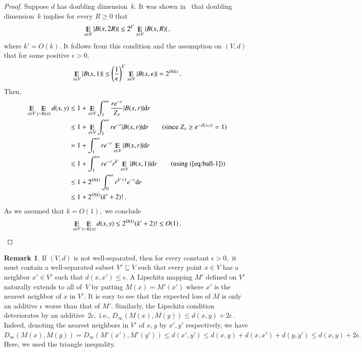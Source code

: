 \documentclass[letterpaper,11pt]{article}
\theoremstyle{definition}
\newtheorem{remark}{Remark}[section]
\renewcommand{\mathbb}{\varmathbb}
\newcommand{\Esymb}{\mathbb{E}}
\DeclareMathOperator*{\E}{\Esymb}
\newcommand{\mper}{\,.}
\newcommand{\mcom}{\,,}
\newcommand{\rd}{\mathrm{d}}
\newcommand\ExM{\mathrm{E}}
\begin{document}
\begin{proof}
Suppose $d$ has doubling dimension~$k.$
It was shown in~\cite{ChanGu08} that doubling dimension~$k$ implies for every
$R\ge0$ that
\begin{equation}\label{eq:ball-avg}
\E_{x\in V} |B(x,2R)|
\le 2^{k'}\E_{x\in V} |B(x,R)|\mcom
\end{equation}
where $k'=O(k).$
It follows from this condition and the assumption on $(V,d)$
that for some positive $\epsilon>0,$
\begin{equation}\label{eq:ball-1}
\E_{x\in V}|B(x,1)|\le
\left(\frac1\epsilon\right)^{k'}\E_{x\in V}|B(x,\epsilon)|= 2^{O(k)}\mper
\end{equation}
Then,
\begin{align*}
\E_{x\in V}\E_{y\sim \ExM(x)}  d(x,y)
& \le 1 +\E_{x\in V}\int_1^\infty \frac{re^{-r}}{Z_x}|B(x,r)|\rd r\\
& \le 1 +\E_{x\in V}\int_1^\infty re^{-r}|B(x,r)|\rd r \tag{since $Z_x\ge
e^{-d(x,x)}=1$}\\
& = 1 + \int_1^\infty re^{-r} \E_{x\in V}|B(x,r)|\rd r\\
& \le 1 + \int_1^\infty re^{-r} r^{k'}\E_{x\in V}|B(x,1)|\rd r
\tag{using~(\ref{eq:ball-1})}\\
& \le 1+ 2^{O(k)}\int_0^\infty r^{k'+1}e^{-r} \rd r\\
& \le 1+ 2^{O(k)}(k'+2)!\mper
\end{align*}
As we assumed that $k=O(1),$ we conclude
\[
\E_{x\in V}\E_{y\sim \ExM(x)} d(x,y)
\le 2^{O(k)}(k'+2)! \le O(1)\mper
\]
\end{proof}
%
\begin{remark}\label{rem:not-separated}
If $(V,d)$ is not well-separated, then for every constant $\epsilon>0,$ it
must contain a well-separated subset
$V'\subseteq V$ such that every point $x\in V$ has a neighbor $x'\in V'$ such
that $d(x,x')\le\epsilon.$ A Lipschitz mapping $M'$ defined on $V'$ naturally
extends to all of~$V$ by putting $M(x)=M'(x')$
where $x'$ is the nearest neighbor of $x$ in $V'.$
It is easy to see that the expected loss of $M$ is only an additive
$\epsilon$ worse than that of $M'.$ Similarly, the Lipschitz condition
deteriorates by an additive~$2\epsilon,$ i.e., $D_\infty(M(x),M(y))\le
d(x,y)+2\epsilon\mper$ Indeed, denoting the nearest neighbors in $V'$
of $x,y$ by $x',y'$ respectively, we have
$D_\infty(M(x),M(y))=D_\infty(M'(x'),M'(y'))\le d(x',y')\le
d(x,y)+d(x,x')+d(y,y')\le d(x,y)+2\epsilon.$ Here, we used the triangle
inequality.
\end{remark}
\end{document}
